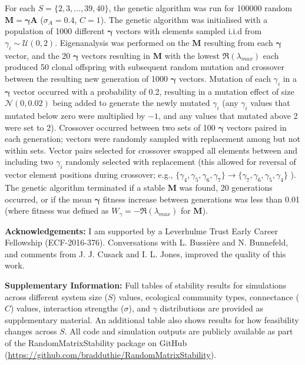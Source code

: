 \documentclass[]{article}
\begin{document}
For each \(S = \{2, 3, ..., 39, 40\}\), the genetic algorithm was run
for 100000 random \(\mathbf{M = \gamma A}\) (\(\sigma_{A} = 0.4\),
\(C = 1\)). The genetic algorithm was initialised with a population of
1000 different \(\mathbf{\gamma}\) vectors with elements sampled i.i.d
from \(\gamma_{i} \sim \mathcal{U}(0, 2)\). Eigenanalysis was performed
on the \(\mathbf{M}\) resulting from each \(\mathbf{\gamma}\) vector,
and the 20 \(\mathbf{\gamma}\) vectors resulting in \(\mathbf{M}\) with
the lowest \(\Re(\lambda_{max})\) each produced 50 clonal offspring with
subsequent random mutation and crossover between the resulting new
generation of 1000 \(\mathbf{\gamma}\) vectors. Mutation of each
\(\gamma_{i}\) in a \(\mathbf{\gamma}\) vector occurred with a
probability of 0.2, resulting in a mutation effect of size
\(\mathcal{N}(0, 0.02)\) being added to generate the newly mutated
\(\gamma_{i}\) (any \(\gamma_{i}\) values that mutated below zero were
multiplied by \(-1\), and any values that mutated above 2 were set to
2). Crossover occurred between two sets of 100 \(\mathbf{\gamma}\)
vectors paired in each generation; vectors were randomly sampled with
replacement among but not within sets. Vector pairs selected for
crossover swapped all elements between and including two \(\gamma_{i}\)
randomly selected with replacement (this allowed for reversal of vector
element positions during crossover; e.g.,
\(\{\gamma_{4}, \gamma_{5}, \gamma_{6}, \gamma_{7}\} \to \{\gamma_{7}, \gamma_{6}, \gamma_{5}, \gamma_{4}\}\)
). The genetic algorithm terminated if a stable \(\mathbf{M}\) was
found, 20 generations occurred, or if the mean \(\mathbf{\gamma}\)
fitness increase between generations was less than 0.01 (where fitness
was defined as \(W_{\gamma} = -\Re(\lambda_{max})\) for \(\mathbf{M}\)).

\textbf{Acknowledgements:} I am supported by a Leverhulme Trust Early
Career Fellowship (ECF-2016-376). Conversations with L. Bussière and N.
Bunnefeld, and comments from J. J. Cusack and I. L. Jones, improved the
quality of this work.

\textbf{Supplementary Information:} Full tables of stability results for
simulations across different system size (\(S\)) values, ecological
community types, connectance (\(C\)) values, interaction strengths
(\(\sigma\)), and \(\gamma\) distributions are provided as supplementary
material. An additional table also shows results for how feasibility
changes across \(S\). All code and simulation outputs are publicly
available as part of the RandomMatrixStability package on GitHub
(\url{https://github.com/bradduthie/RandomMatrixStability}).
\end{document}
